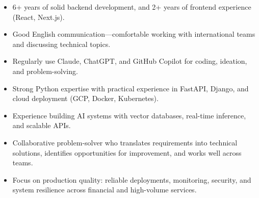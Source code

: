 

\begin{cvparagraph}

\begin{itemize}
  \item {6+ years of solid backend development, and 2+ years of frontend experience (React, Next.js).}
  \item {Good English communication—comfortable working with international teams and discussing technical topics.}
  \item {Regularly use Claude, ChatGPT, and GitHub Copilot for coding, ideation, and problem-solving.}
  \item {Strong Python expertise with practical experience in FastAPI, Django, and cloud deployment (GCP, Docker, Kubernetes).}
  \item {Experience building AI systems with vector databases, real-time inference, and scalable APIs.}
  \item {Collaborative problem-solver who translates requirements into technical solutions, identifies opportunities for improvement, and works well across teams.}
  \item {Focus on production quality: reliable deployments, monitoring, security, and system resilience across financial and high-volume services.}
\end{itemize}


\end{cvparagraph}
